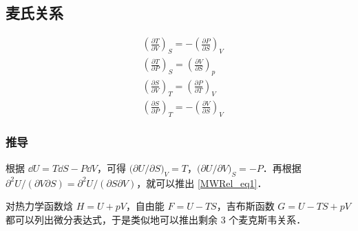 \subsection{麦氏关系}

\begin{align}
&\left(\frac{\partial T}{\partial V}\right)_S=-\left(\frac{\partial P}{\partial S}\right)_V\label{MWRel_eq1}
\\
&\left(\frac{\partial T}{\partial P}\right)_S=\left(\frac{\partial V}{\partial S}\right)_p
\\
&\left(\frac{\partial S}{\partial V}\right)_T=\left(\frac{\partial P}{\partial T}\right)_V
\\
&\left(\frac{\partial S}{\partial P}\right)_T=-\left(\frac{\partial V}{\partial S}\right)_V
\end{align}

\subsubsection{推导}
根据 $\dd U=T\dd S-P\dd V$，可得 $\Big(\partial U/\partial S\Big)_V=T$，$\Big(\partial U/\partial V\Big)_S=-P$．再根据 $\partial^2 U/(\partial V\partial S)=\partial^2 U/(\partial S\partial V)$，就可以推出 \autoref{MWRel_eq1}．

对热力学函数焓 $H=U+pV$，自由能 $F=U-TS$，吉布斯函数 $G=U-TS+pV$ 都可以列出微分表达式，于是类似地可以推出剩余 $3$ 个麦克斯韦关系．

